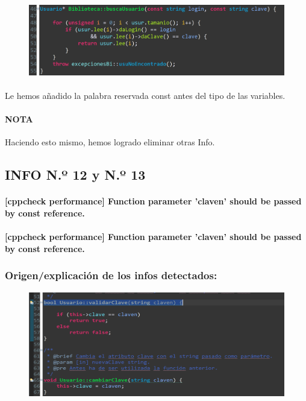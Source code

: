 			\begin{figure}[H]
				\centering
				\includegraphics[scale=0.55]{img/esteban17.png}
				\label{esteban17}
			\end{figure}
		
			\paragraph{}Le hemos añadido la palabra reservada const antes del tipo de las variables.
			
			\paragraph{NOTA}Haciendo esto mismo, hemos logrado eliminar otras Info.	
			
	\subsection{INFO N.º 12 y N.º 13}
	
		\paragraph{[cppcheck performance] Function parameter 'claven' should be passed by const reference.}
		
		\paragraph{[cppcheck performance] Function parameter 'claven' should be passed by const reference.}
	
		\subsubsection{Origen/explicación de los infos detectados:}
		
			\begin{figure}[H]
				\centering
				\includegraphics[scale=0.55]{img/esteban18.png}
				\label{esteban18}
			\end{figure}
		
